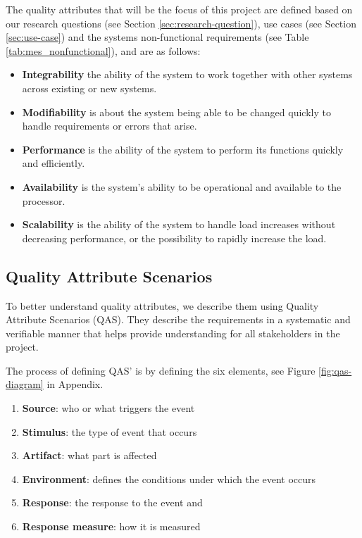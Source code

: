 The quality attributes that will be the focus of this project are defined based on our research questions (see Section \ref{sec:research-question}), use cases (see Section \ref{sec:use-case}) and the systems non-functional requirements (see Table \ref{tab:mes_nonfunctional}), and are as follows:
\begin{itemize}
    \item \textbf{Integrability} the ability of the system to work together with other systems across existing or new systems.
    \item \textbf{Modifiability} is about the system being able to be changed quickly to handle requirements or errors that arise.
    \item \textbf{Performance} is the ability of the system to perform its functions quickly and efficiently.
    \item \textbf{Availability} is the system's ability to be operational and available to the processor.
     \item \textbf{Scalability} is the ability of the system to handle load increases without decreasing performance, or the possibility to rapidly increase the load.
\end{itemize}





\subsection{Quality Attribute Scenarios}
To better understand quality attributes, we describe them using Quality Attribute Scenarios (QAS). They describe the requirements in a systematic and verifiable manner that helps provide understanding for all stakeholders in the project.

The process of defining QAS' is by defining the six elements, see Figure \ref{fig:qas-diagram} in Appendix.

\begin{enumerate}
    \item \textbf{Source}: who or what triggers the event
    \item \textbf{Stimulus}: the type of event that occurs
    \item \textbf{Artifact}: what part is affected
    \item \textbf{Environment}: defines the conditions under which the event occurs
    \item \textbf{Response}: the response to the event and 
    \item \textbf{Response measure}: how it is measured
\end{enumerate}

